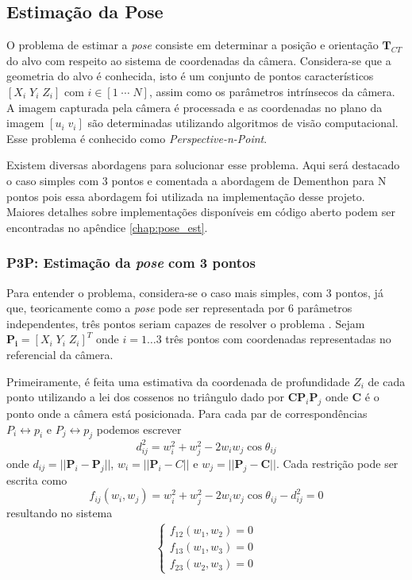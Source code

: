 \subsection{Estimação da Pose}
O problema de estimar a \textit{pose} consiste em determinar a posição e orientação $\bm{T}_{CT}$ do alvo com respeito ao sistema de coordenadas da câmera. Considera-se que a geometria do alvo é conhecida, isto é um conjunto de pontos característicos $[X_i \; Y_i \; Z_i]$ com $i \in [1\; \cdots \; N]$, assim como os parâmetros intrínsecos da câmera. A imagem capturada pela câmera é processada e as coordenadas no plano da imagem $[u_i\; v_i]$ são determinadas utilizando algoritmos de visão computacional. Esse problema é conhecido como \textit{Perspective-n-Point}.

Existem diversas abordagens para solucionar esse problema. Aqui será destacado o caso simples com 3 pontos e comentada a abordagem de Dementhon para N pontos pois essa abordagem foi utilizada na implementação desse projeto. Maiores detalhes sobre implementações disponíveis em código aberto podem ser encontradas no apêndice \ref{chap:pose_est}. 

\subsubsection{P3P: Estimação da \textit{pose} com 3 pontos}
Para entender o problema, considera-se o caso mais simples, com 3 pontos, já que, teoricamente como a \textit{pose} pode ser representada por 6 parâmetros independentes, três pontos seriam capazes de resolver o problema \cite{marchand2016pose}. Sejam $\bm{P_i} = [X_i \; Y_i \; Z_i ]^T$ onde $i = 1 \dots 3$ três pontos com coordenadas representadas no referencial da câmera. 

Primeiramente, é feita uma estimativa da coordenada de profundidade $Z_i$ de cada ponto utilizando a lei dos cossenos no triângulo dado por $\bm{C} \bm{P}_i \bm{P}_j$ onde $\bm{C}$ é o ponto onde a câmera está posicionada. Para cada par de correspondências $P_i \leftrightarrow p_i$ e $P_j \leftrightarrow p_j$ podemos escrever \cite{quan1999linear} 
\begin{equation}
d_{ij}^2 = w_i^2 + w_j^2 -2 w_i w_j \cos \theta_{ij}
\end{equation}
onde $d_{ij} = ||\bm{P}_i - \bm{P}_j||$, $w_i = ||\bm{P}_i - C||$ e $w_j = ||\bm{P}_j - \bm{C}||$. Cada restrição pode ser escrita como 
\begin{equation}
f_{ij}(w_i, w_j) = w_i^2 + w_j^2 - 2w_i w_j \cos \theta_{ij} - d_{ij}^2 = 0
\end{equation}
resultando no sistema
\begin{align*}
\begin{cases}
f_{12}(w_1, w_2) = 0 \\ 
f_{13}(w_1, w_3) = 0 \\ 
f_{23}(w_2, w_3) = 0
\end{cases}
\end{align*}

